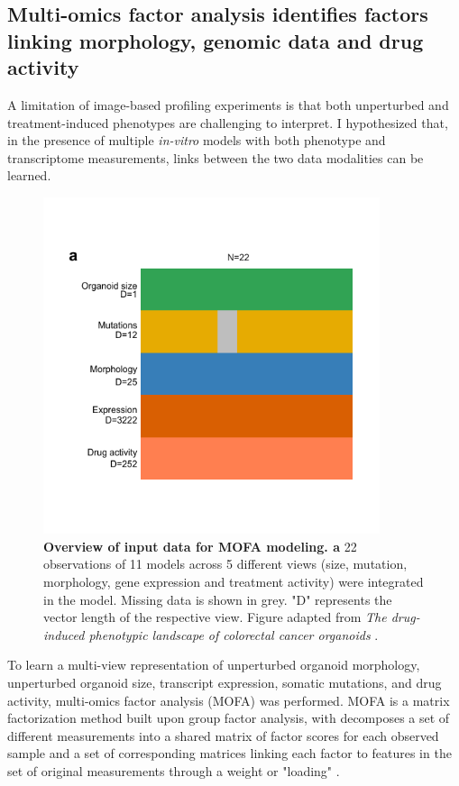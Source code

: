 \begin{flushleft}
\section{Multi-omics factor analysis identifies factors linking morphology, genomic data and drug activity}

A limitation of image-based profiling experiments is that both unperturbed and treatment-induced phenotypes are challenging to interpret. I hypothesized that, in the presence of multiple \textit{in-vitro} models with both phenotype and transcriptome measurements, links between the two data modalities can be learned. 

\begin{figure}[!h]
\centering
\includegraphics[width=280pt,
                height=\textheight,
                keepaspectratio]{figures/promise/pdf/fig_4_2.pdf}
\caption[Overview of input data for MOFA modeling]{\textbf{Overview of input data for MOFA modeling. a} 22 observations of 11 models across 5 different views (size, mutation, morphology, gene expression and treatment activity) were integrated in the model. Missing data is shown in grey. "D" represents the vector length of the respective view. Figure adapted from \textit{The drug-induced phenotypic landscape of colorectal cancer organoids} \parencite{betgeDruginducedPhenotypicLandscape2022}.}
\label{fig_242}
\end{figure}

To learn a multi-view representation of unperturbed organoid morphology, unperturbed organoid size, transcript expression, somatic mutations, and drug activity, multi-omics factor analysis (MOFA) was performed. MOFA is a matrix factorization method built upon group factor analysis, with decomposes a set of different measurements into a shared matrix of factor scores for each observed sample and a set of corresponding matrices linking each factor to features in the set of original measurements through a weight or "loading" \parencite{argelaguetMultiOmicsFactorAnalysis2018b}. 


\end{flushleft}
